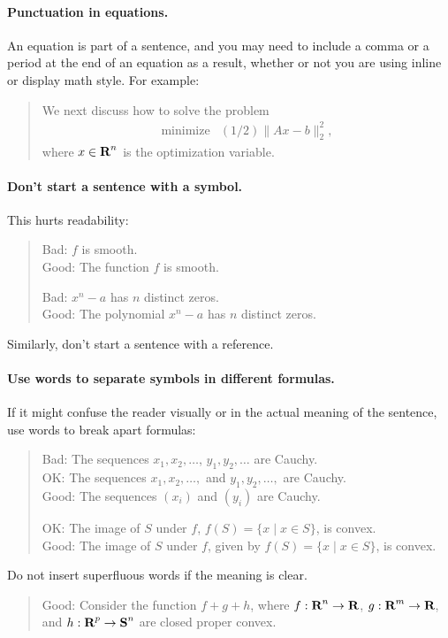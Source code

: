 \documentclass[12pt]{article}
\begin{document}
\paragraph{Punctuation in equations.}
An equation is part of a sentence, and you may need to include a comma or a period
at the end of an equation as a result, whether or not you are using inline or
display math style. For example:
\begin{quote}
    We next discuss how to solve the problem
    \[
        \begin{array}{ll}
            \mbox{minimize} & (1/2)\|Ax - b\|_2^2,
        \end{array}
    \]
    where $x \in {\mbox{\bf R}}^n$ is the optimization variable.
\end{quote}

\paragraph{Don't start a sentence with a symbol.}
This hurts readability:
\begin{quote}
Bad: $f$ is smooth.\\
Good: The function $f$ is smooth.

Bad: $x^n - a$ has $n$ distinct zeros. \\
Good: The polynomial $x^n - a$ has $n$ distinct zeros.
\end{quote}
Similarly, don't start a sentence with a reference.

\paragraph{Use words to separate symbols in different formulas.}
If it might confuse the reader visually or in the actual
meaning of the sentence, use words to break apart formulas:
\begin{quote}
Bad: The sequences $x_1, x_2, \dots$, $y_1, y_2, \dots$ are Cauchy. \\
OK: The sequences $x_1, x_2, \dots,$ and $y_1, y_2, \dots,$ are Cauchy. \\
Good: The sequences $(x_i)$ and $(y_i)$ are Cauchy.

OK: The image of $S$ under $f$, $f(S) = \{ x \mid x \in S \}$, is convex. \\
Good: The image of $S$ under $f$, given by $f(S) = \{ x \mid x \in S \}$, is convex.
\end{quote}
Do not insert superfluous words if the meaning is clear.
\begin{quote}
Good: Consider the function $f + g + h$, where $f : {\mbox{\bf R}}^n \to
{\mbox{\bf R}}$, $g : {\mbox{\bf R}}^m \to {\mbox{\bf R}}$, and $h : {\mbox{\bf R}}^p \to {\mbox{\bf S}}^n$ are closed
proper convex.
\end{quote}
\end{document}

